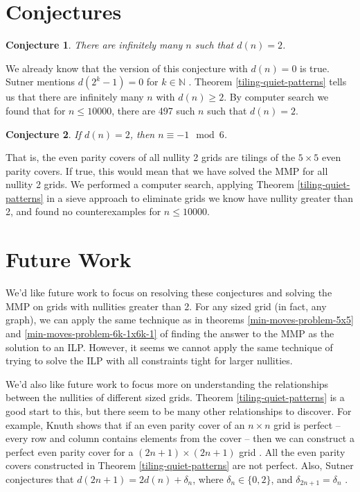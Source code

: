 \documentclass[a4paper]{article}
\newtheorem{conjecture}{Conjecture}
\newcommand{\N}{\mathbb{N}}
\begin{document}
	\section{Conjectures}
	\begin{conjecture}\label{infinite-nullity-2}
		There are infinitely many $n$ such that $d(n) = 2$.
	\end{conjecture}
	We already know that the version of this conjecture with $d(n)=0$ is true.
	Sutner mentions $d(2^k - 1) = 0$ for $k \in \N$ \cite{Sutner1989}.
	Theorem \ref{tiling-quiet-patterns} tells us that there are infinitely many $n$ with $d(n) \geq 2$.
	By computer search we found that for $n \leq 10000$, there are 497 such $n$ such that $d(n) = 2$.
	
	\begin{conjecture}\label{all-nullity2-conj}
		If $d(n) = 2$, then $n \equiv -1 \mod 6$.
	\end{conjecture}
	That is, the even parity covers of all nullity 2 grids are tilings of the $5 \times 5$ even parity covers.
	If true, this would mean that we have solved the MMP for all nullity 2 grids.
	We performed a computer search, applying Theorem \ref{tiling-quiet-patterns} in a sieve approach to eliminate grids we know have nullity greater than 2, and found no counterexamples for $n \leq 10000$.
	
	\section{Future Work}
	We'd like future work to focus on resolving these conjectures and solving the MMP on grids with nullities greater than 2.
	For any sized grid (in fact, any graph), we can apply the same technique as in theorems \ref{min-moves-problem-5x5} and \ref{min-moves-problem-6k-1x6k-1} of finding the answer to the MMP as the solution to an ILP.
	However, it seems we cannot apply the same technique of trying to solve the ILP with all constraints tight for larger nullities.
	
	We'd also like future work to focus more on understanding the relationships between the nullities of different sized grids.
	Theorem \ref{tiling-quiet-patterns} is a good start to this, but there seem to be many other relationships to discover.
	For example, Knuth shows that if an even parity cover of an $n \times n$ grid is perfect -- every row and column contains elements from the cover -- then we can construct a perfect even parity cover for a $(2n+1) \times (2n+1)$ grid \cite{Knuth_AOCP4A}.
	All the even parity covers constructed in Theorem \ref{tiling-quiet-patterns} are not perfect.
	Also, Sutner conjectures that $d(2n+1) = 2d(n) + \delta_n$, where $\delta_n \in \{0,2\}$, and $\delta_{2n+1} = \delta_n$ \cite{Sutner1989}.
	
	\newpage
	
	
\end{document}
